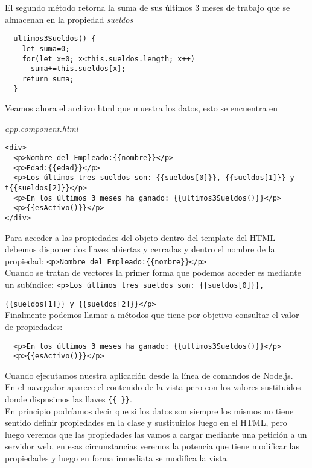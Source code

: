 \documentclass[12pt]{book} %
\begin{document}
El segundo método retorna la suma de sus últimos 3 meses de trabajo que se almacenan en la propiedad \emph{sueldos}\\

\begin{verbatim}
  ultimos3Sueldos() {
    let suma=0;
    for(let x=0; x<this.sueldos.length; x++)
      suma+=this.sueldos[x];
    return suma;
  }
\end{verbatim}

Veamos ahora el archivo html que muestra los datos, esto se encuentra en 

\emph{app.component.html}

\begin{verbatim}
<div>
  <p>Nombre del Empleado:{{nombre}}</p>
  <p>Edad:{{edad}}</p>  
  <p>Los últimos tres sueldos son: {{sueldos[0]}}, {{sueldos[1]}} y 
t{{sueldos[2]}}</p>
  <p>En los últimos 3 meses ha ganado: {{ultimos3Sueldos()}}</p>
  <p>{{esActivo()}}</p>
</div>
\end{verbatim}

Para acceder a las propiedades del objeto dentro del template del HTML debemos disponer dos llaves abiertas y cerradas y dentro el nombre de la propiedad: \verb_<p>Nombre del Empleado:{{nombre}}</p>_\\

Cuando se tratan de vectores la primer forma que podemos acceder es mediante un subíndice: \verb_<p>Los últimos tres sueldos son: {{sueldos[0]}},_

\verb_{{sueldos[1]}} y {{sueldos[2]}}</p>_\\

Finalmente podemos llamar a métodos que tiene por objetivo consultar el valor de propiedades:

\begin{verbatim}
  <p>En los últimos 3 meses ha ganado: {{ultimos3Sueldos()}}</p>
  <p>{{esActivo()}}</p>
\end{verbatim}

Cuando ejecutamos nuestra aplicación desde la línea de comandos de Node.js.\\

En el navegador aparece el contenido de la vista pero con los valores sustituidos donde dispusimos las llaves \verb_{{ }}_.\\

En principio podríamos decir que si los datos son siempre los mismos no tiene sentido definir propiedades en la clase y sustituirlos luego en el HTML, pero luego veremos que las propiedades las vamos a cargar mediante una petición a un servidor web, en esas circunstancias veremos la potencia que tiene modificar las propiedades y luego en forma inmediata se modifica la vista.\\
\end{document}
